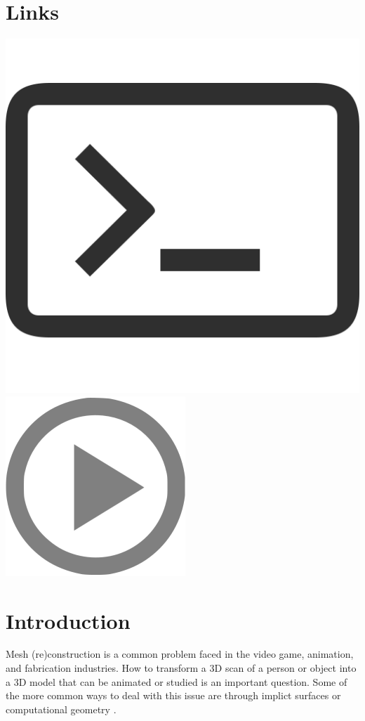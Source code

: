 \documentclass[sigconf]{acmart}
\begin{document}
\section{Links}
\href{https://github.com/AdamSturge/geometry-processing-project}{\includegraphics[scale=.03]{code-icon.png}}
\hspace{1mm}
\href{https://drive.google.com/open?id=0Bxe_aqElJ61ULXk0S284Y25xME0}{\includegraphics[scale=.058]{video-play.png}}

\section{Introduction}

Mesh (re)construction is a common problem faced in the video game, animation, and fabrication industries. How to transform a 3D scan of a person or object into a 3D model that can be animated or studied is an important question. Some of the more common ways to deal with this issue are through implict surfaces \cite{Hoppe:2006} or computational geometry \cite{Amenta:2001:PC:376957.376986}.
\end{document}
